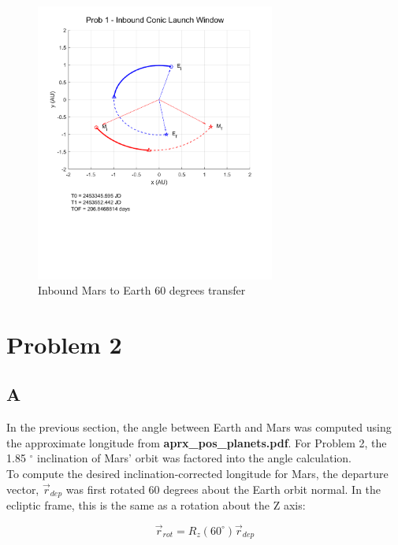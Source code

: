 \documentclass[conf]{new-aiaa}
\begin{document}
\begin{figure}[H]
    \centering 
    \includegraphics[width=0.7\textwidth]{Prob 1 - Inbound Conic Launch Window.pdf}
    \caption{Inbound Mars to Earth 60 degrees transfer}
\end{figure}

\section*{Problem 2}

\subsection*{A}
In the previous section, the angle between Earth and Mars was computed using the approximate longitude from \textbf{aprx\_pos\_planets.pdf}. For Problem 2, the 1.85 $^\circ$ inclination of Mars' orbit was factored into the angle calculation. \\ 

To compute the desired inclination-corrected longitude for Mars, the departure vector, $\overrightarrow{r} _{dep}$ was first rotated 60 degrees about the Earth orbit normal. In the ecliptic frame, this is the same as a rotation about the Z axis:  

\begin{equation}
    \overrightarrow{r}_{rot}  = R_z(60 ^\circ) \overrightarrow{r}_{dep}  
\end{equation}
\end{document}
